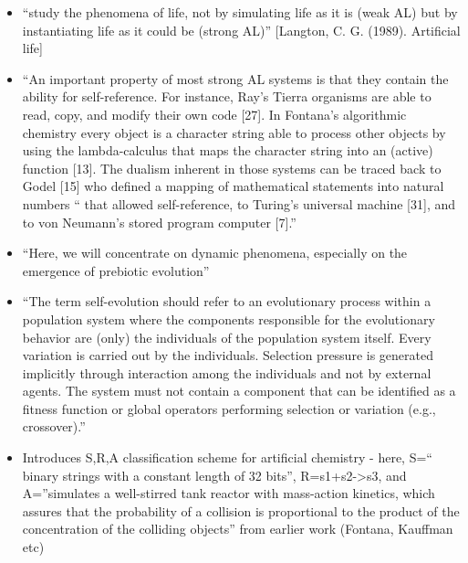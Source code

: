 		\begin{itemize}
			\item
			
			``study the phenomena of life, not by simulating life as it is (weak
			AL) but by instantiating life as it could be (strong AL)'' {[}Langton,
			C. G. (1989). Artificial life{]}
			
			\item
			
			``An important property of most strong AL systems is that they contain
			the ability for self-reference. For instance, Ray's Tierra organisms
			are able to read, copy, and modify their own code {[}27{]}. In
			Fontana's algorithmic chemistry every object is a character string
			able to process other objects by using the lambda-calculus that maps
			the character string into an (active) function {[}13{]}. The dualism
			inherent in those systems can be traced back to Godel {[}15{]} who
			defined a mapping of mathematical statements into natural numbers ``
			that allowed self-reference, to Turing's universal machine {[}31{]},
			and to von Neumann's stored program computer {[}7{]}.''
			
			\item
			
			``Here, we will concentrate on dynamic phenomena, especially on the
			emergence of prebiotic evolution''
			
			\item
			
			``The term self-evolution should refer to an evolutionary process
			within a population system where the components responsible for the
			evolutionary behavior are (only) the individuals of the population
			system itself. Every variation is carried out by the individuals.
			Selection pressure is generated implicitly through interaction among
			the individuals and not by external agents. The system must not
			contain a component that can be identified as a fitness function or
			global operators performing selection or variation (e.g.,
			crossover).''
			
			\item
			
			Introduces S,R,A classification scheme for artificial chemistry -
			here, S=`` binary strings with a constant length of 32 bits'',
			R=s1+s2-\textgreater{}s3, and A=''simulates a well-stirred tank
			reactor with mass-action kinetics, which assures that the probability
			of a collision is proportional to the product of the concentration of
			the colliding objects'' from earlier work (Fontana, Kauffman etc)
			

\end{itemize}
